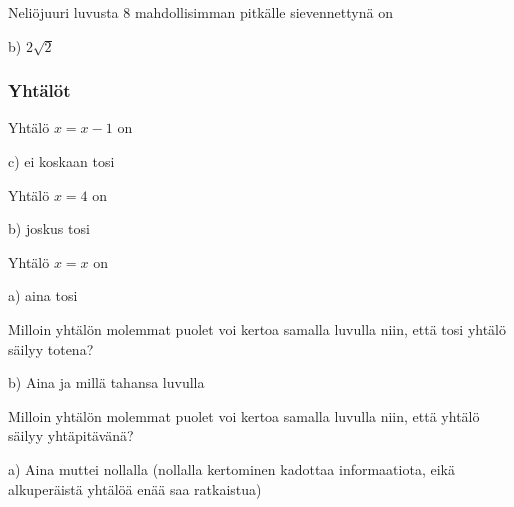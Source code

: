 \begin{tehtava}
Neliöjuuri luvusta $8$ mahdollisimman pitkälle sievennettynä on
  \begin{vastaus}
	 b) $2\sqrt{2}$
    \end{vastaus}
\end{tehtava}

\subsubsection*{Yhtälöt}

\begin{tehtava}
Yhtälö $x = x-1$ on
\begin{vastaus}
c) ei koskaan tosi
\end{vastaus}
\end{tehtava}

\begin{tehtava}
Yhtälö $x = 4$ on
\begin{vastaus}
b) joskus tosi
\end{vastaus}
\end{tehtava}

\begin{tehtava}
Yhtälö $x = x$ on
\begin{vastaus}
a) aina tosi
\end{vastaus}
\end{tehtava}

\begin{tehtava}
Milloin yhtälön molemmat puolet voi kertoa samalla luvulla niin, että tosi yhtälö säilyy totena?
	\begin{vastaus}
b) Aina ja millä tahansa luvulla
	\end{vastaus}
\end{tehtava}

\begin{tehtava}
Milloin yhtälön molemmat puolet voi kertoa samalla luvulla niin, että yhtälö säilyy yhtäpitävänä?
\begin{vastaus}
a) Aina muttei nollalla (nollalla kertominen kadottaa informaatiota, eikä alkuperäistä yhtälöä enää saa ratkaistua)
\end{vastaus}
\end{tehtava}

